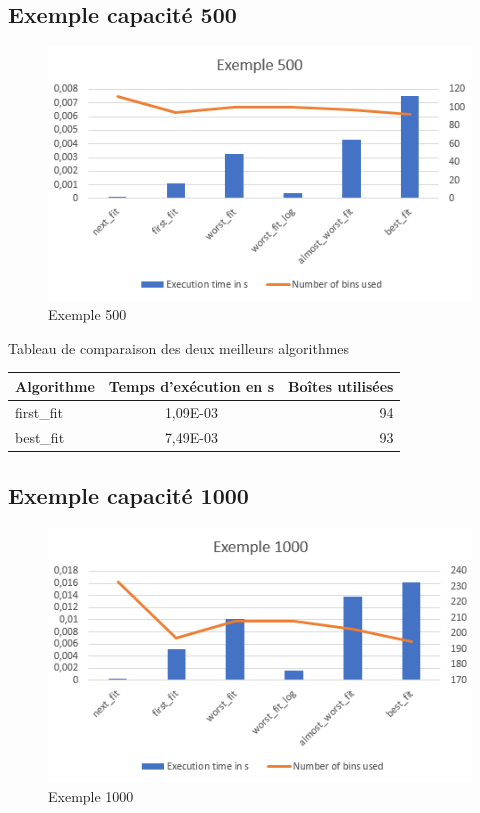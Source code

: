 \documentclass{article}
\begin{document}
\subsection{Exemple capacité 500}
\begin{figure}[h]
\begin{center}
\includegraphics{exemple500.png}
\end{center}
\caption{Exemple 500}
\end{figure}

\begin{center}
Tableau de comparaison des deux meilleurs algorithmes

\begin{tabular}{|l|c|r|}
  \hline
  Algorithme & Temps d'exécution en s & Boîtes utilisées \\
  \hline
  first\_fit & 1,09E-03 & 94 \\
  best\_fit & 7,49E-03  & 93 \\
  \hline
\end{tabular}
\end{center}

\clearpage
\subsection{Exemple capacité 1000}
\begin{figure}[h]
\begin{center}
\includegraphics{exemple1000.png}
\end{center}
\caption{Exemple 1000}
\end{figure}
\end{document}
